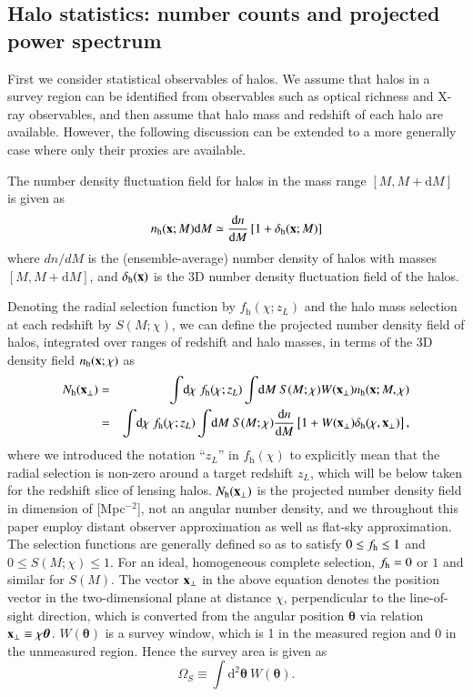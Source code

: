 \documentclass[onecolumn,notitlepage,showpacs,amsmath,amssymb,prd,floatfix]{revtex4-1}
\newcommand{\bx}{{\bf x}}
\newcommand{\btheta}{{\bm{\theta}}}
\newcommand{\dr}{\mathrm{d}}
\newcommand{\deltah}{\delta_{\mathrm{h}}}
\newcommand{\bh}{\mathrm{h}}
\newcommand{\bnh}{\frac{\dr n}{\dr M}}
\begin{document}
\subsection{Halo statistics: number counts and projected power spectrum}

First we consider statistical observables of halos. We assume that halos
in a survey region can be identified from observables such as optical
richness and X-ray observables, and then assume that halo mass and
redshift of each halo are available. However, the following discussion
can be extended to a more generally case where only their proxies
are available.

The number density fluctuation field for halos in the mass range
$[M,M+\dr M]$ is given as
%
\begin{equation}
 n_\bh(\bx; M)\dr M\simeq
  \frac{\dr n}{\dr M}
  \left[1+\deltah(\bx; M)\right]
\end{equation}
%
where
$dn/dM$ is the (ensemble-average) number density of halos with masses
 $[M,M+\dr M]$, and $\deltah(\bx)$ is the 3D number density fluctuation
 field of the halos.


Denoting the radial selection function by $f_\bh(\chi;z_L)$ and the halo
mass selection at each redshift by $S(M;\chi)$, we can define the
projected number density field of halos, integrated over ranges of
redshift and halo masses, in terms of the 3D density field $n_{\rm
h}(\bx;\chi)$ as
%
\begin{eqnarray}
 N_{\rm h}(\bx_\perp)&=&\int\!\dr\chi~f_\bh(\chi;z_L)\int\!\dr M~S(M;\chi)W(\bx_\perp)
  n_\bh(\bx;M,\chi)\nonumber\\
 &=&\int\!\dr\chi~f_\bh(\chi;z_L)\int\!\dr M~S(M;\chi)\frac{\dr n}{\dr M}
  \left[1+W(\bx_\perp)\deltah(\chi,\bx_\perp)\right],
  \label{eq:Nh}
\end{eqnarray}
%
where we introduced the notation ``$z_L$'' in $f_\bh(\chi)$ to
explicitly mean that the radial selection is non-zero around a target
redshift $z_L$, which will be below taken for the redshift slice of
lensing halos.  $N_{\rm h}(\bx_\perp)$ is the projected number density
field in dimension of [Mpc$^{-2}$], not an angular number density, and
we throughout this paper employ distant observer approximation as well
as flat-sky approximation.  The selection functions are generally
defined so as to satisfy $0\le f_{\rm h}\le 1$ and $0\le S(M;\chi)\le
1$. For an ideal, homogeneous complete selection, $f_{\rm h}=0$ or $1$
and similar for $S(M)$.  The vector $\bx_\perp$ in the above equation
denotes the position vector in the two-dimensional plane at distance
$\chi$, perpendicular to the line-of-sight direction, which is converted
from the angular position $\btheta$ via relation $\bx_\perp\equiv
\chi\btheta$. $W(\btheta)$ is a survey window, which is 1 in the
measured region and 0 in the unmeasured region. Hence the survey area is
given as
%
\begin{equation}
 \Omega_S\equiv \int\!\dr^2\btheta~W(\btheta).
\end{equation}
%
\end{document}
